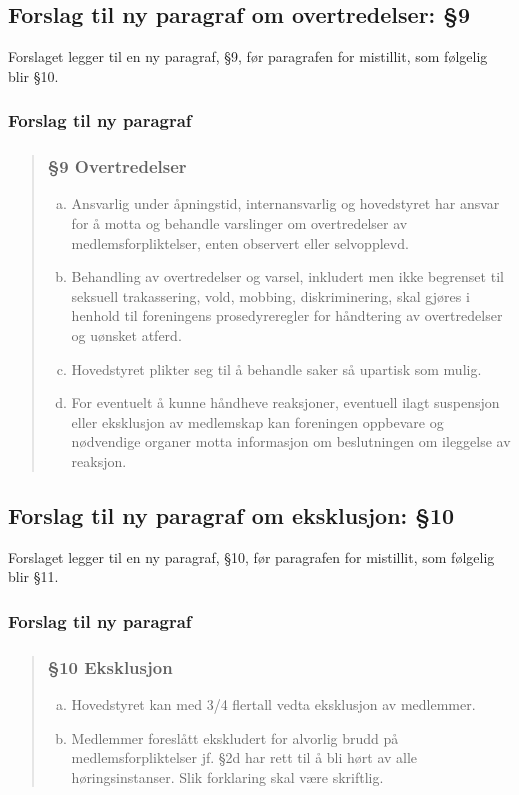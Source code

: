 \documentclass[10pt,norsk,a4paper]{article}
\begin{document}
\subsection{Forslag til ny paragraf om overtredelser: §9}
Forslaget legger til en ny paragraf, §9, før paragrafen for mistillit, som følgelig blir §10.

\subsubsection*{Forslag til ny paragraf}
\begin{quote}
	\subsubsection*{§9 Overtredelser}
	\begin{enumerate}[a)]
		\item Ansvarlig under åpningstid, internansvarlig og hovedstyret har ansvar for å motta og behandle varslinger om overtredelser av medlemsforpliktelser, enten observert eller selvopplevd.
		\item Behandling av overtredelser og varsel, inkludert men ikke begrenset til seksuell trakassering, vold, mobbing, diskriminering, skal gjøres i henhold til foreningens prosedyreregler for håndtering av overtredelser og uønsket atferd.
		\item Hovedstyret plikter seg til å behandle saker så upartisk som mulig.
		\item For eventuelt å kunne håndheve reaksjoner, eventuell ilagt suspensjon eller eksklusjon av medlemskap kan foreningen oppbevare og nødvendige organer motta informasjon om beslutningen om ileggelse av reaksjon.
	\end{enumerate}
\end{quote}

\subsection{Forslag til ny paragraf om eksklusjon: §10}
Forslaget legger til en ny paragraf, §10, før paragrafen for mistillit, som følgelig blir §11.

\subsubsection*{Forslag til ny paragraf}
\begin{quote}
	\subsubsection*{§10 Eksklusjon}
	\begin{enumerate}[a)]
		\item Hovedstyret kan med 3/4 flertall vedta eksklusjon av medlemmer.
		\item Medlemmer foreslått ekskludert for alvorlig brudd på medlemsforpliktelser jf. §2d har rett til å bli hørt av alle høringsinstanser. Slik forklaring skal være skriftlig.
	\end{enumerate}
\end{quote}
\end{document}
